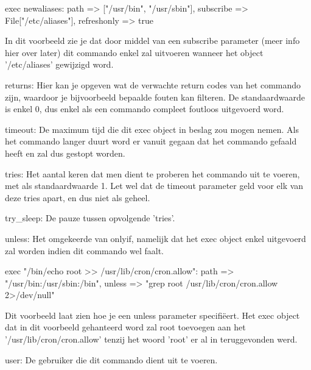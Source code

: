 			exec { newaliases:
				path => ["/usr/bin", "/usr/sbin"],
				subscribe => File["/etc/aliases"],
				refreshonly => true
			}

		In dit voorbeeld zie je dat door middel van een subscribe parameter (meer info hier over later) dit commando enkel zal uitvoeren wanneer het object '/etc/aliases' gewijzigd word.

		returns:
		Hier kan je opgeven wat de verwachte return codes van het commando zijn, waardoor je bijvoorbeeld bepaalde fouten kan filteren.
		De standaardwaarde is enkel 0, dus enkel als een commando compleet foutloos uitgevoerd word.

		timeout:
		De maximum tijd die dit exec object in beslag zou mogen nemen.
		Als het commando langer duurt word er vanuit gegaan dat het commando gefaald heeft en zal dus gestopt worden.

		tries:
		Het aantal keren dat men dient te proberen het commando uit te voeren, met als standaardwaarde 1.
		Let wel dat de timeout parameter geld voor elk van deze tries apart, en dus niet als geheel.

		try_sleep:
		De pauze tussen opvolgende 'tries'.

		unless:
		Het omgekeerde van onlyif, namelijk dat het exec object enkel uitgevoerd zal worden indien dit commando wel faalt.

			exec { "/bin/echo root >> /usr/lib/cron/cron.allow":
				path => "/usr/bin:/usr/sbin:/bin",
				unless => "grep root /usr/lib/cron/cron.allow 2>/dev/null"
			}

		Dit voorbeeld laat zien hoe je een unless parameter specifiëert.
		Het exec object dat in dit voorbeeld gehanteerd word zal root toevoegen aan het '/usr/lib/cron/cron.allow' tenzij het woord 'root' er al in teruggevonden werd.

		user:
		De gebruiker die dit commando dient uit te voeren.

